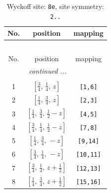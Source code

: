 \documentclass[fleqn,8pt]{jsarticle}
\begin{document}
\renewcommand{\arraystretch}{1.2}
\begin{longtable}{ccc}
\caption{Wyckoff site: {\tt 8e}, site symmetry: {\tt 2..}}
 \\
 \hline \hline
No. & position & mapping \\ \hline \endfirsthead

\multicolumn{2}{l}{\tablename\ \thetable{}} \\
 \hline \hline
No. & position & mapping \\ \hline \endhead

 \hline \hline
\multicolumn{2}{r}{\footnotesize\it continued ...} \\ \endfoot

 \hline \hline
\multicolumn{2}{r}{} \\ \endlastfoot

1 & $\left[ \frac{3}{4},\, \frac{1}{4},\, z \right]$ & {\tt [1,6]} \\ \hline
2 & $\left[ \frac{1}{4},\, \frac{3}{4},\, z \right]$ & {\tt [2,3]} \\ \hline
3 & $\left[ \frac{1}{4},\, \frac{3}{4},\, \frac{1}{2} - z \right]$ & {\tt [4,5]} \\ \hline
4 & $\left[ \frac{3}{4},\, \frac{1}{4},\, \frac{1}{2} - z \right]$ & {\tt [7,8]} \\ \hline
5 & $\left[ \frac{1}{4},\, \frac{3}{4},\, - z \right]$ & {\tt [9,14]} \\ \hline
6 & $\left[ \frac{3}{4},\, \frac{1}{4},\, - z \right]$ & {\tt [10,11]} \\ \hline
7 & $\left[ \frac{3}{4},\, \frac{1}{4},\, z + \frac{1}{2} \right]$ & {\tt [12,13]} \\ \hline
8 & $\left[ \frac{1}{4},\, \frac{3}{4},\, z + \frac{1}{2} \right]$ & {\tt [15,16]} \\
\end{longtable}
\renewcommand{\arraystretch}{1.2}
\end{document}
